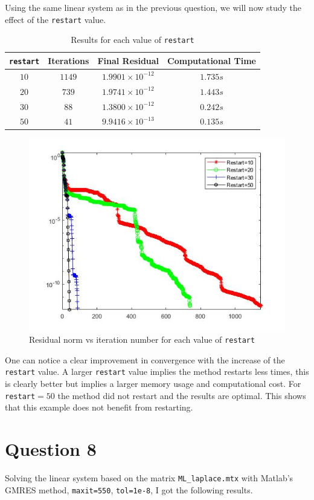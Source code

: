 \documentclass[a4paper, 11pt]{article}
\begin{document}
			Using the same linear system as in the previous question, we will now study the effect of the \texttt{restart} value.
			\begin{table}[H]
				\centering
				\begin{tabular}{c|c|c|c}
					\texttt{\textbf{restart}} &  \textbf{Iterations} 	& \textbf{Final Residual} 		& \textbf{Computational Time} 	\\ \hline
					$ 10 $			& 			$1149$ 		& $ 1.9901 \times 10^{-12} $ 	& $ 1.735 s $	\\ \hline	
					$ 20 $			& 			$739$		& $ 1.9741 \times 10^{-12} $	& $ 1.443 s $	\\ \hline
					$ 30 $			& 			$88$ 		& $ 1.3800 \times 10^{-12} $ 	& $ 0.242 s $	\\ \hline	
					$ 50 $			& 			$41$		& $ 9.9416 \times 10^{-13} $	& $ 0.135 s $	\\
				\end{tabular}
				\caption{Results for each value of \texttt{restart}}
				\label{table:ex7}
			\end{table}
			
			\begin{figure}[H]
				\centering
				\includegraphics[width=.6\linewidth]{ex7.jpg}
				\caption{Residual norm vs iteration number for each value of \texttt{restart}}
				\label{fig:ex7}
			\end{figure}
			
			One can notice a clear improvement in convergence with the increase of the \texttt{restart} value.
			A larger \texttt{restart} value implies the method restarts less times, this is clearly better but implies a larger memory usage and computational cost.
			For \texttt{restart}$ = 50 $ the method did not restart and the results are optimal.
			This shows that this example does not benefit from restarting.
		
		\section*{Question 8}
			Solving the linear system based on the matrix \texttt{ML\_laplace.mtx} with Matlab's GMRES method, \texttt{maxit=550}, \texttt{tol=1e-8}, I got the following results.
			
\end{document}
